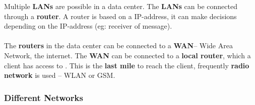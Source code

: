 Multiple \textbf{LANs} are possible in a data center. The \textbf{LANs} can be connected through a \textbf{router}. A router is based on a IP-address, it can make decisions depending on the IP-address (eg: receiver of message). \\ \ \\

The \textbf{routers} in the data center can be connected to a \textbf{WAN}-- Wide Area Network, the internet. The \textbf{WAN} can be connected to a \textbf{local router}, which a client has access to . This is the \textbf{last mile} to reach the client, frequently \textbf{radio network} is used -- WLAN or GSM.

\subsubsection{Different Networks}
